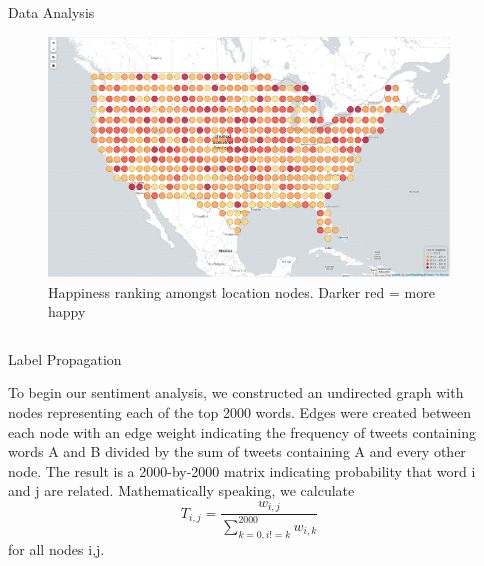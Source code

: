 \documentclass[final]{beamer}
\newlength{\sepwid}
\newlength{\onecolwid}
\newlength{\twocolwid}
\begin{document}
\begin{frame}[t]
\begin{columns}[t]
\begin{column}{\sepwid}\end{column} %

\begin{column}{\twocolwid} %


\begin{block}{Data Analysis}
\begin{figure}[h]


\begin{center}\includegraphics[width=1.0\linewidth]{happyMap} \end{center}
\caption{Happiness ranking amongst location nodes. Darker red = more happy}
\end{figure}
\end{block} 

\begin{columns}[t,totalwidth=\twocolwid] %

\begin{column}{\onecolwid}\vspace{-.6in} %


\begin{block}{Label Propagation}
\small{
To begin our sentiment analysis, we constructed an undirected graph with nodes representing each of the top 2000 words. Edges were created between each node with an edge weight indicating the frequency of tweets containing words A and B divided by the sum of tweets containing A and every other node. The result is a 2000-by-2000 matrix indicating probability that word i and j are related. Mathematically speaking, 
we calculate 
\begin{equation}
T_{i,j} = \frac{w_{i,j}}{\sum_{k=0, i!=k}^{2000} w_{i,k}}
\end{equation}
for all nodes i,j. 

}
\end{block}
\end{column}
\end{columns}
\end{column}
\end{columns}
\end{frame}
\end{document}
